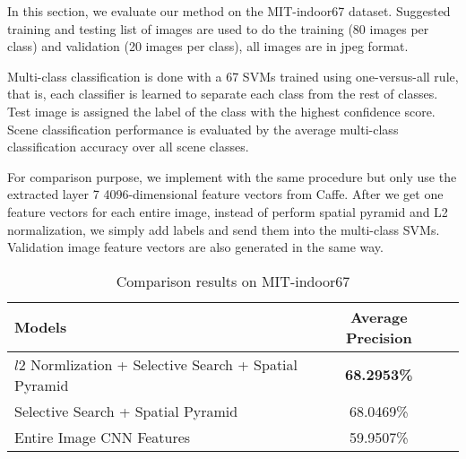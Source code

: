 
In this section, we evaluate our method on the MIT-indoor67 dataset. Suggested training and
testing list of images are used to do the training (80 images per class) and validation (20
images per class), all images are in jpeg format.

Multi-class classification is done with a 67 SVMs trained using one-versus-all rule, that is, each
classifier is learned to separate each class from the rest of classes. Test image is assigned the
label of the class with the highest confidence score. Scene classification performance is
evaluated by the average multi-class classification accuracy over all scene classes.

For comparison purpose, we implement with the same procedure but only use
the extracted layer 7 4096-dimensional feature vectors from Caffe. After we get
one feature vectors for each entire image, instead of perform spatial pyramid
and L2 normalization, we simply add labels and send them into the multi-class
SVMs. Validation image feature vectors are also generated in the same way.

\begin{table*}[ht]
        \caption{Comparison results on MIT-indoor67}
        \centering
        \begin{tabular}{l c c}
        \hline \hline
        Models                & Average Precision \\ \hline
        $l2$ Normlization + Selective Search + Spatial Pyramid & {\bf{68.2953\%}} \\
        Selective Search + Spatial Pyramid & 68.0469\% \\
        Entire Image CNN Features & 59.9507\% \\
        \hline
        \end{tabular}
        \label{tab:overall}
\end{table*}


